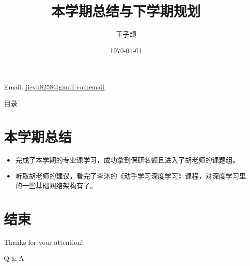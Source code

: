 \documentclass[aspectratio=169]{beamer}
\title{本学期总结与下学期规划}
\author{王子颉}
\institute{School of Computer and Informatics, HFUT}
\date{\today}
\makeatletter
\newcommand{\contactinfo}{
  \begin{center}
    Email: \href{mailto:jieyu8258@gmail.com}{jieyu8258@gmail.comemail}
  \end{center}
}
\makeatother
\begin{document}
\begin{frame}
	\maketitle
	\contactinfo
\end{frame}

\begin{frame}{目录}
	\tableofcontents
\end{frame}

\section{本学期总结}

\begin{frame}
  \begin{itemize}
    \item 完成了本学期的专业课学习，成功拿到保研名额且进入了胡老师的课题组。
    \item 听取胡老师的建议，看完了李沐的《动手学习深度学习》课程，对深度学习里的一些基础网络架构有了。
  \end{itemize}
\end{frame}

\section{结束}

\begin{frame}
	\begin{center}
    {\Huge\calligra Thanks for your attention!}
    \vspace{1cm}

    {\Huge Q \& A}
  \end{center}
\end{frame}
\end{document}
